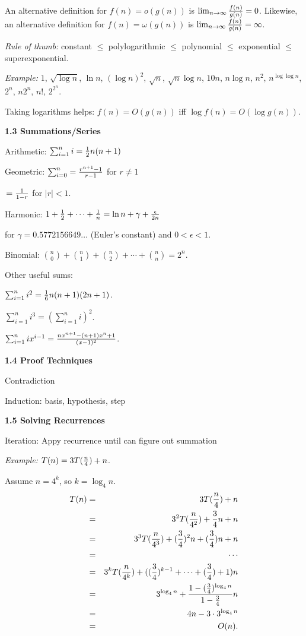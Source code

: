 An alternative definition for $f(n)=o(g(n))$ is 
$\lim_{n\to\infty}{f(n)\over g(n)}=0$. Likewise, an alternative definition
for $f(n)=\omega(g(n))$ is $\lim_{n\to\infty}{f(n)\over g(n)}=\infty$.

{\em Rule of thumb:} constant $\le$ polylogarithmic $\le$ polynomial
$\le$ exponential $\le$ superexponential.

{\em Example:} $1$, $\sqrt{\log n}$, $\ln n$, $(\log n)^2$, $\sqrt n$,
$\sqrt n \log n$, $10n$, $n\log n$, $n^2$, $n^{\log\log n}$,
$2^n$, $n2^n$, $n!$, $2^{2^n}$.

Taking logarithms helps: $f(n)=O(g(n))$ iff $\log f(n)=O(\log g(n))$.


    \textbf{1.3 Summations/Series}

Arithmetic: $\sum_{i=1}^{n} i = {1\over2}n(n+1)$

Geometric: $\sum_{i=0}^{n} = {{r^{n+1}-1}\over{r-1}}$ for
$r\not=1$

\;\;\;\;\;\;\;\;\;\;\;\;\,\;\;\;\;\;\;\;\;\;\;\;\;\;\;\;\;$={1\over{1-r}}$ for $|r|<1$.

Harmonic: $1+{1\over2}+\cdots+{1\over n}
=\ln n+\gamma+{\epsilon\over{2n}}$

for $\gamma=0.5772156649\ldots$
(Euler's constant) and $0<\epsilon<1$.


Binomial: ${n\choose 0}+{n\choose 1}+{n\choose 2}+
\cdots+{n\choose n}=2^n$.

Other useful sums:

$\sum_{i=1}^n i^2={1\over6}n(n+1)(2n+1)$.

$\sum_{i=1}^n i^3=(\sum_{i=1}^n i)^2$.

$\sum_{i=1}^n ix^{i-1}={{nx^{n+1}-(n+1)x^n+1}\over{(x-1)^2}}$.


    \textbf{1.4 Proof Techniques}

Contradiction

Induction: basis, hypothesis, step



    \textbf{1.5 Solving Recurrences}

Iteration: Appy recurrence until can figure out summation

{\em Example:} $T(n)=3T({n\over4})+n$.

Assume $n=4^k$, so $k=\log_4 n$.
\begin{eqnarray*}
T(n)&=&3T({n\over4})+n\\
&=&3^2T({n\over{4^2}})+{3\over4}n+n\\
&=&3^3T({n\over{4^3}})+({3\over4})^2n+({3\over4})n+n\\
&=&\cdots\\
&=&3^kT({n\over{4^k}})+(({3\over4})^{k-1}+\cdots+({3\over4})+1)n\\
&=&3^{\log_4 n}+{{1-({3\over4})^{\log_4 n}}\over{1-{3\over4}}}n\\
&=&4n-3\cdot 3^{\log_4 n}\\
&=&O(n).
\end{eqnarray*}


